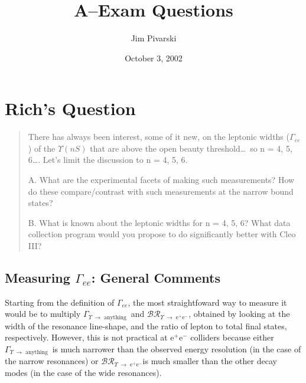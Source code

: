 \documentclass[12pt]{article}
\author{Jim Pivarski}
\date{October 3, 2002}
\title{A--Exam Questions}
\def\gamee{$\Gamma_{ee}$}
\def\gamtotot{$\Gamma_{\Upsilon\ \to \mbox{ anything}}$}
\def\brtoee{$\mathcal{BR}_{\Upsilon\ \to \mbox{ e$^+$e$^-$}}$}
\begin{document}
\section{Rich's Question}

\begin{quote}
There has always been interest, some of it new, on the leptonic widths
($\Gamma_{ee}$) of the $\Upsilon(nS)$ that are above the open beauty
threshold\ldots\ so n = 4, 5, 6\ldots. Let's limit the discussion to n =
4, 5, 6.

A. What are the experimental facets of making such measurements? How
do these compare/contrast with such measurements at the narrow bound
states?

B. What is known about the leptonic widths for n = 4, 5, 6? What data
collection program would you propose to do significantly better with
{\sc Cleo III}?
\end{quote}

\subsection{Measuring \gamee: General Comments}

Starting from the definition of \gamee, the most straightfoward way to
measure it would be to multiply \gamtotot\ and \brtoee, obtained by
looking at the width of the resonance line-shape, and the ratio of
lepton to total final states, respectively. However, this is not
practical at e$^+$e$^-$ colliders because either \gamtotot\ is much
narrower than the observed energy resolution (in the case of the
narrow resonances) or \brtoee is much smaller than the other decay
modes (in the case of the wide resonances).
\end{document}
